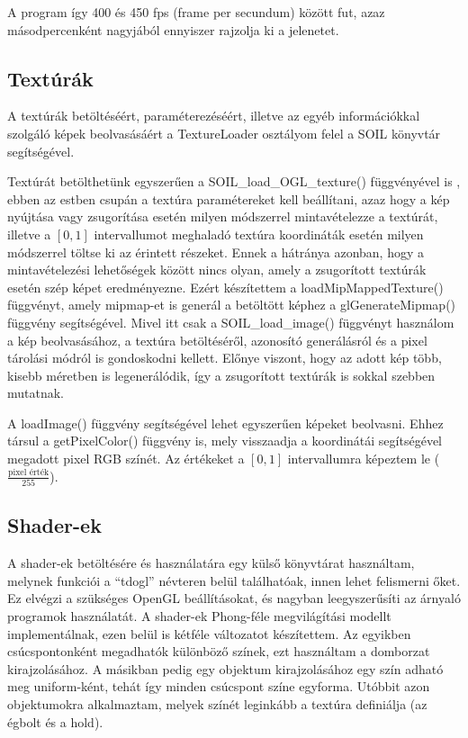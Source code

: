 A program így 400 és 450 fps (frame per secundum) között fut, azaz másodpercenként nagyjából ennyiszer rajzolja ki a jelenetet.

\subsection{Textúrák}
A textúrák betöltéséért, paraméterezéséért, illetve az egyéb információkkal szolgáló képek beolvasásáért a TextureLoader osztályom felel a SOIL könyvtár segítségével. 

Textúrát betölthetünk egyszerűen a SOIL\_load\_OGL\_texture() függvényével is , ebben az estben csupán a textúra paramétereket kell beállítani, azaz hogy a kép nyújtása vagy zsugorítása esetén milyen módszerrel mintavételezze a textúrát, illetve a $[0, 1]$ intervallumot meghaladó textúra koordináták esetén milyen módszerrel töltse ki az érintett részeket. Ennek a hátránya azonban, hogy a mintavételezési lehetőségek között nincs olyan, amely a zsugorított textúrák esetén szép képet eredményezne. Ezért készítettem a loadMipMappedTexture() függvényt, amely mipmap-et is generál a betöltött képhez a glGenerateMipmap() függvény segítségével. Mivel itt csak a SOIL\_load\_image() függvényt használom a kép beolvasásához, a textúra betöltéséről, azonosító generálásról és a pixel tárolási módról is gondoskodni kellett. Előnye viszont, hogy az adott kép több, kisebb méretben is legenerálódik, így a zsugorított textúrák is sokkal szebben mutatnak.

A loadImage() függvény segítségével lehet egyszerűen képeket beolvasni. Ehhez társul a getPixelColor() függvény is, mely visszaadja a koordinátái segítségével megadott pixel RGB színét. Az értékeket a $[0, 1]$ intervallumra képeztem le ($\frac{\text{pixel érték}}{255}$).

\subsection{Shader-ek}
A shader-ek betöltésére és használatára egy külső könyvtárat használtam, melynek funkciói a ``tdogl'' névteren belül találhatóak, innen lehet felismerni őket. Ez elvégzi a szükséges OpenGL beállításokat, és nagyban leegyszerűsíti az árnyaló programok használatát. A shader-ek Phong-féle megvilágítási modellt implementálnak, ezen belül is kétféle változatot készítettem. Az egyikben csúcspontonként megadhatók különböző színek, ezt használtam a domborzat kirajzolásához. A másikban pedig egy objektum kirajzolásához egy szín adható meg uniform-ként, tehát így minden csúcspont színe egyforma. Utóbbit azon objektumokra alkalmaztam, melyek színét leginkább a textúra definiálja (az égbolt és a hold).

